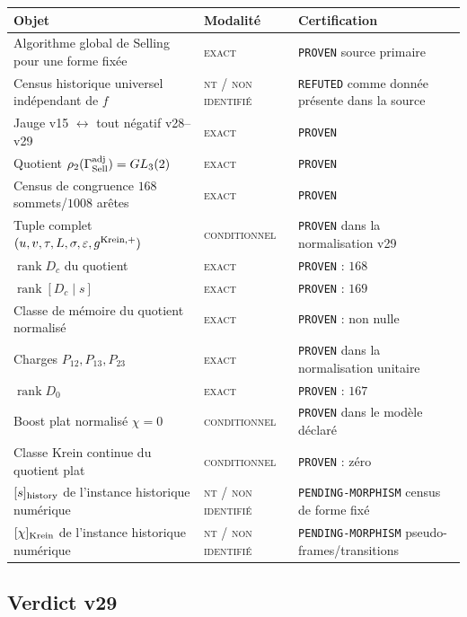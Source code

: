 \documentclass[11pt,a4paper]{article}
\newcommand{\rank}{\operatorname{rank}}
\newcommand{\statusExact}{\textsc{exact}}
\newcommand{\statusCond}{\textsc{conditionnel}}
\newcommand{\statusNT}{\textsc{nt / non identifié}}
\newcommand{\certProven}{\texttt{PROVEN}}
\newcommand{\certRefuted}{\texttt{REFUTED}}
\newcommand{\certPending}{\texttt{PENDING-MORPHISM}}
\begin{document}
\begin{longtable}{p{}p{}p{}}
\toprule
Objet & Modalité & Certification\\
\midrule
\endhead
Algorithme global de Selling pour une forme fixée & \statusExact & \certProven{} source primaire\\
Census historique universel indépendant de $f$ & \statusNT & \certRefuted{} comme donnée présente dans la source\\
Jauge v15 $\leftrightarrow$ tout négatif v28--v29 & \statusExact & \certProven\\
Quotient $\rho_2(\Gamma_{\rm Sell}^{\rm adj})=GL_3(2)$ & \statusExact & \certProven\\
Census de congruence $168$ sommets/$1008$ arêtes & \statusExact & \certProven\\
Tuple complet $(u,v,\tau,L,\sigma,\varepsilon,g^{\rm Krein,+})$ & \statusCond & \certProven{} dans la normalisation v29\\
$\rank D_c$ du quotient & \statusExact & \certProven{} : $168$\\
$\rank[D_c\mid s]$ & \statusExact & \certProven{} : $169$\\
Classe de mémoire du quotient normalisé & \statusExact & \certProven{} : non nulle\\
Charges $P_{12},P_{13},P_{23}$ & \statusExact & \certProven{} dans la normalisation unitaire\\
$\rank D_0$ & \statusExact & \certProven{} : $167$\\
Boost plat normalisé $\chi=0$ & \statusCond & \certProven{} dans le modèle déclaré\\
Classe Krein continue du quotient plat & \statusCond & \certProven{} : zéro\\
$[s]_{\rm history}$ de l'instance historique numérique & \statusNT & \certPending{} census de forme fixé\\
$[\chi]_{\rm Krein}$ de l'instance historique numérique & \statusNT & \certPending{} pseudo-frames/transitions\\
\bottomrule
\end{longtable}

\subsection{Verdict v29}
\end{document}
